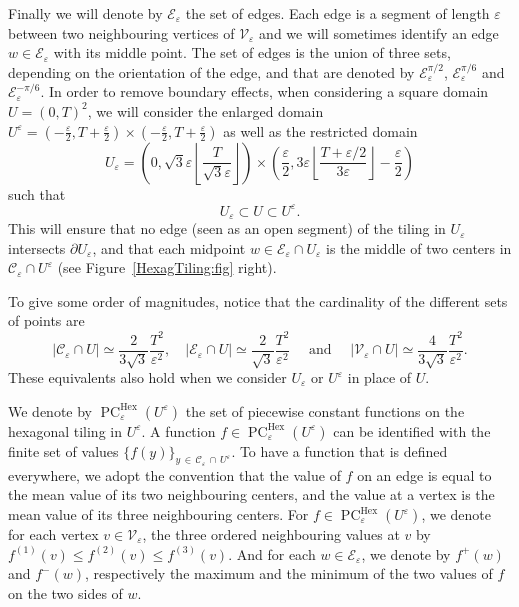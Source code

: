 \documentclass[AHL,Unicode,longabstracts,published]{cedram}
\newcommand{\eps}{\varepsilon}
\DeclareMathOperator{\PC}{PC}
\DeclareMathOperator{\Hex}{Hex}
\newcommand{\calC}{\mathcal{C}}
\newcommand{\calV}{\mathcal{V}}
\newcommand{\calE}{\mathcal{E}}
\begin{document}
Finally we will denote by $\calE_\eps$ the set of edges. Each edge is a segment of length $\eps$ between two neighbouring vertices of $\calV_\eps$ and we will sometimes identify an edge $w\in\calE_\eps$ with its middle point. The set of edges is the union of three sets, depending on the orientation of the edge, and that are denoted by $\calE_\eps^{\pi/2}$, $\calE_\eps^{\pi/6}$ and $\calE_\eps^{-\pi/6}$. In order to remove boundary effects, when considering a square domain $U=(0,T)^2$, we will consider the enlarged domain $U^{\eps}=(-\tfrac{\eps}{2},T+\tfrac{\eps}{2})\times (-\tfrac{\eps}{2},T+\tfrac{\eps}{2})$ as well as the restricted domain
\[
U_\eps=\left(0,\sqrt{3}\eps
\left\lfloor \frac{T}{\sqrt{3}\eps}\right\rfloor\right)\times
\left(\frac{\eps}{2},3\eps\left\lfloor\frac{T+\eps/2}{{3}\eps}\right\rfloor-\frac{\eps}{2}\right)
\]
such that
\[
U_\eps\subset U\subset U^{\eps}.
\]
This will ensure that no
edge (seen as an open segment) of the tiling in $U_\eps$ intersects $\partial U_\eps$, and that each midpoint $w\in \calE_\eps \cap U_\eps$ is the middle of two centers in ${\calC}_\eps\cap U^{\eps}$ (see Figure~\ref{HexagTiling:fig} right).

To give some order of magnitudes, notice that the cardinality of the different sets of points are
\[
\left|\calC_\eps \cap U \right|\simeq \frac{2}{3\sqrt{3}} \frac{T^2}{\eps^2}, \quad
\left|\calE_\eps \cap U \right|\simeq \frac{2}{\sqrt{3}} \frac{T^2}{\eps^2}
\quad \text{ and } \quad \left|\calV_\eps \cap U \right|\simeq \frac{4}{3\sqrt{3}} \frac{T^2}{\eps^2}.
\]
These equivalents also hold when we consider $U_\eps$ or $U^\eps$ in place of $U$.


We denote by $\PC^{\Hex}_\eps(U^{\eps})$ the set of piecewise constant functions on the hexagonal tiling in $U^{\eps}$. A function $f\in
\PC^{\Hex}_\eps(U^{\eps})$ can be identified with the finite set of values $\{ f(y)\}_{y\,\in\,\calC_\eps\, \cap\,U^{\eps}}$. To have a function that is defined everywhere, we adopt the convention that the value of $f$ on an edge is equal to the mean value of its two neighbouring centers, and the value at a vertex is the mean value of its three neighbouring centers. For $f\in \PC^{\Hex}_\eps(U^{\eps})$, we denote for each vertex $v\in {\calV}_\varepsilon$, the three ordered neighbouring values at $v$ by $f^{(1)}(v)\le f^{(2)}(v)\le f^{(3)}(v)$. And for each $w\in\calE_\eps$, we denote by $f^+(w)$ and $f^-(w)$, respectively the maximum and the minimum of the two values of $f$ on the two sides of $w$.
\end{document}
